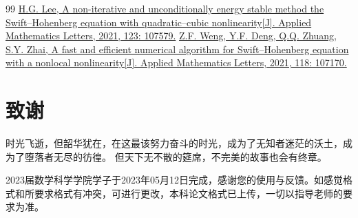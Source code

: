 \documentclass[10pt,a4paper]{article}
\let\songti\relax
\begin{document}
    \begin{thebibliography}{99}
        \addtolength{\itemsep}{0em} %
        \setlength{\itemsep}{0pt}
        \href{https://www.sciencedirect.com/science/article/pii/S0893965921003098}{H.G. Lee, A non-iterative and unconditionally energy stable method the Swift–Hohenberg equation with quadratic–cubic nonlinearity[J]. Applied Mathematics Letters, 2021, 123: 107579.}
        \href{https://www.sciencedirect.com/science/article/pii/S0893965921000847}{Z.F. Weng, Y.F. Deng, Q.Q. Zhuang, S.Y. Zhai, A fast and efficient numerical algorithm for Swift–Hohenberg equation with a nonlocal nonlinearity[J]. Applied Mathematics Letters, 2021, 118: 107170.}

    \end{thebibliography}
    
    \endgroup




    \newpage
    \section*{致谢}
    \fancyhead[C]{\zihao{5}\songti{致谢}}
    时光飞逝，但韶华犹在，在这最该努力奋斗的时光，成为了无知者迷茫的沃土，成为了堕落者无尽的彷徨。
    但天下无不散的筵席，不完美的故事也会有终章。

    2023届数学科学学院学子于2023年05月12日完成，感谢您的使用与反馈。如感觉格式和所要求格式有冲突，可进行更改，本科论文格式已上传，一切以指导老师的要求为准。
\end{document}
